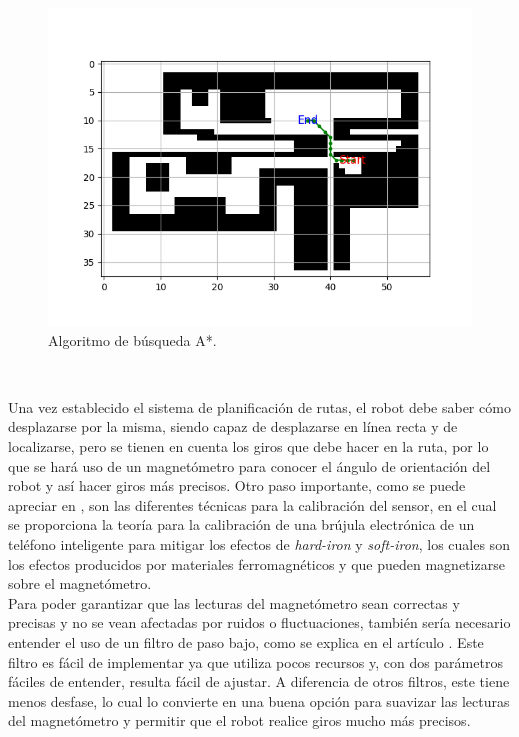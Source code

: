 \begin{figure} [H]
  \begin{center}
    \includegraphics[scale=0.6]{figs/astar}
  \end{center}
  \caption{Algoritmo de búsqueda A*.}
  \label{fig:astar}
\end{figure}\

Una vez establecido el sistema de planificación de rutas, el robot debe saber cómo desplazarse por la misma, siendo capaz de desplazarse en línea recta y de localizarse, pero se tienen en cuenta los giros que debe hacer en la ruta, por lo que se hará uso de un magnetómetro para conocer el ángulo de orientación del robot y así hacer giros más precisos. Otro paso importante, como se puede apreciar en \cite{Ozyagcilar2015}, son las diferentes técnicas para la calibración del sensor, en el cual se proporciona la teoría para la calibración de una brújula electrónica de un teléfono inteligente para mitigar los efectos de \textit{hard-iron} y \textit{soft-iron}, los cuales son los efectos producidos por materiales ferromagnéticos y que pueden magnetizarse sobre el magnetómetro.\\

Para poder garantizar que las lecturas del magnetómetro sean correctas y precisas y no se vean afectadas por ruidos o fluctuaciones, también sería necesario entender el uso de un filtro de paso bajo, como se explica en el artículo \cite{low_pass_filter}. Este filtro es fácil de implementar ya que utiliza pocos recursos y, con dos parámetros fáciles de entender, resulta fácil de ajustar. A diferencia de otros filtros, este tiene menos desfase, lo cual lo convierte en una buena opción para suavizar las lecturas del magnetómetro y permitir que el robot realice giros mucho más precisos.\\

